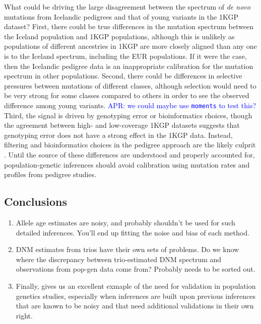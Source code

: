 \documentclass[]{article}
\newcommand{\aprcomment}[1]{{\textcolor{blue}{APR: #1}}}
\begin{document}
What could be driving the large disagreement between the spectrum of \emph{de
novo} mutations from Icelandic pedigrees and that of young variants in the 1KGP
dataset? First, there could be true differences in the mutation spectrum
between the Iceland population and 1KGP populations, although this is unlikely
as populations of different ancestries in 1KGP are more closely aligned than
any one is to the Iceland spectrum, including the EUR populations. If it were
the case, then the Icelandic pedigree data is an inappropriate calibration for
the mutation spectrum in other populations. Second, there could be differences
in selective pressures between mutations of different classes, although
selection would need to be very strong for some classes compared to others in
order to see the observed difference among young variants. \aprcomment{we could
maybe use \texttt{moments} to test this?} Third, the signal is driven by
genotyping error or bioinformatics choices, though the agreement between high-
and low-coverage 1KGP datasets suggests that genotyping error does not have a
strong effect in the 1KGP data. Instead, filtering and bioinformatics choices
in the pedigree approach are the likely culprit
\citep{bergeron2022mutationathon}. Until the source of these differences are
understood and properly accounted for, population-genetic inferences should
avoid calibration using mutation rates and profiles from pedigree studies.

\subsection*{Conclusions}

\begin{enumerate}
    \item Allele age estimates are noisy, and probably shouldn't be used
        for such detailed inferences. You'll end up fitting the noise and
        bias of each method.
    \item DNM estimates from trios have their own sets of problems. Do we
        know where the discrepancy between trio-estimated DNM spectrum and
        observations from pop-gen data come from? Probably needs to be
        sorted out.
    \item Finally, \citet{wang2023human} gives us an excellent exmaple of the
        need for validation in population genetics studies, especially when
        inferences are built upon previous inferences that are known to be
        noisy and that need additional validations in their own right.
\end{enumerate}



\end{document}
